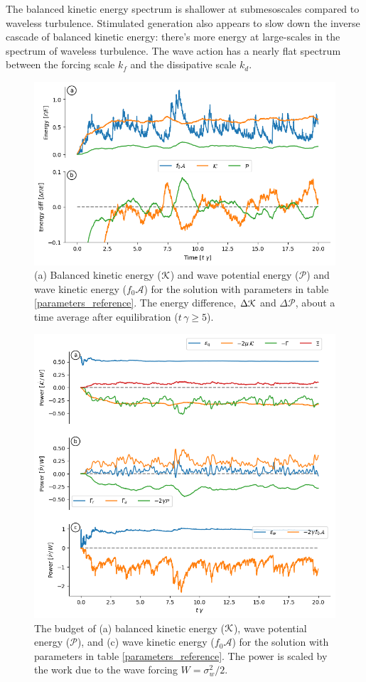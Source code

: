 \documentclass[12pt]{article}
\renewcommand{\P}{\mathcal{P}}
\newcommand{\A}{  \mathcal{A}}
\begin{document}
The balanced kinetic energy spectrum is shallower at submesoscales compared to
waveless turbulence. Stimulated generation also appears to slow down the
inverse cascade of balanced kinetic energy: there's more energy at large-scales
in the spectrum of waveless turbulence. The wave action has a nearly flat spectrum
between the forcing scale $k_f$ and the dissipative scale $k_d$.

\begin{figure}
\centering
\includegraphics[width=.825\textwidth]{figs/energies_reference.png}
\caption{(a) Balanced kinetic energy ($\mathcal{K}$) and wave potential energy ($\P$) and wave
         kinetic energy ($f_0 \A$)  for the solution with parameters in table
         \ref{parameters_reference}. The energy difference, $\Delta \mathcal{K}$ and $\Delta \P$,
         about a time average after equilibration ($t\,\gamma \ge 5$).}
        \label{energies_reference}
\end{figure}

\begin{figure}
\centering
\includegraphics[width=.825\textwidth]{figs/K_and_P_and_A_budget_reference.png}
\caption{The budget of (a) balanced kinetic energy ($\mathcal{K}$), wave potential energy ($\P$),
        and (c) wave
         kinetic energy ($f_0 \A$)  for the solution with parameters in table
         \ref{parameters_reference}. The power is scaled by the work due to the
         wave forcing $W=\sigma_w^2/2$.}
        \label{energy_budgets_reference}
\end{figure}
\end{document}
